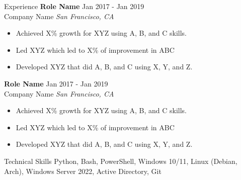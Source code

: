 \documentclass{resume} %
\begin{document}
\begin{rSection}{Experience}
    \textbf{Role Name} \hfill Jan 2017 - Jan 2019\\
    Company Name \hfill \textit{San Francisco, CA}
     \begin{itemize}
        \itemsep -3pt {} 
         \item Achieved X\% growth for XYZ using A, B, and C skills.
         \item Led XYZ which led to X\% of improvement in ABC
        \item Developed XYZ that did A, B, and C using X, Y, and Z. 
     \end{itemize}
     
    \textbf{Role Name} \hfill Jan 2017 - Jan 2019\\
    Company Name \hfill \textit{San Francisco, CA}
     \begin{itemize}
        \itemsep -3pt {} 
         \item Achieved X\% growth for XYZ using A, B, and C skills.
         \item Led XYZ which led to X\% of improvement in ABC
        \item Developed XYZ that did A, B, and C using X, Y, and Z. 
     \end{itemize}
\end{rSection} 


\begin{rSection}{Technical Skills}
    Python, Bash, PowerShell, Windows 10/11, Linux (Debian, Arch), Windows Server 2022, Active Directory, Git \\

\end{rSection}
\end{document}
